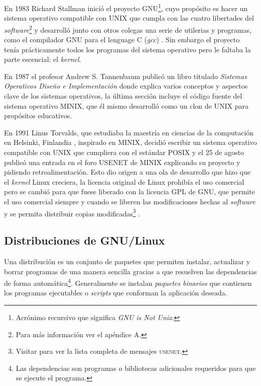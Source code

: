 En 1983 Richard Stallman inici\'{o} el proyecto \textsc{GNU}\footnote{Acr\'{o}nimo recursivo que significa \textit{GNU is Not Unix}.}, cuyo prop\'{o}sito es hacer un sistema operativo compatible con \textsc{UNIX} que cumpla con las cuatro libertades del \textit{software}\footnote{Para m\'{a}s informaci\'{o}n ver el ap\'{e}ndice A.} y desarroll\'{o} junto con otros colegas una serie de utilerias y programas, como el compilador \textsc{GNU} para el lenguage \textsc{C} (\textit{gcc}) \cite{_about_????}. Sin embargo el proyecto ten\'{i}a pr\'{a}cticamente todos los programas del sistema operativo pero le faltaba la parte escencial: el \textit{kernel}.

En 1987 el profesor Andrew S. Tannenbaum public\'{o} un libro titulado \textit{Sistemas Operativos Dise\~{n}o e Implementaci\'{o}n} \cite{tanenbaum_operating_2006} donde explica varios conceptos y aspectos clave de los sistemas operativos, la \'{u}ltima secci\'{o}n incluye el c\'{o}digo fuente del sistema operativo \textsc{MINIX}, que \'{e}l mismo desarroll\'{o} como un clon de \textsc{UNIX} para prop\'{o}sitos educativos\cite{_complete_????}.

En 1991 Linus Torvalds, que estudiaba la maestr\'{i}a en ciencias de la computaci\'{o}n en Helsinki, Finlandia \cite{_staff_????}, inspirado en \textsc{MINIX}, decidi\'{o} escribir un sistema operativo compatible con UNIX que cumpliera con el est\'{a}ndar \textsc{POSIX} y el 25 de agosto public\'{o} una entrada en el foro \textsc{USENET} de \textsc{MINIX} \cite{_history_????} explicando su proyecto y pidiendo retroalimentaci\'{o}n. Esto dio origen a una ola de desarrollo que hizo que el \textit{kernel} Linux creciera, la licencia original de Linux prohib\'{i}a el uso comercial pero se cambi\'{o} para que fuese liberado con la licencia \textsc{GPL} de \textsc{GNU}, que permite el uso comercial siempre y cuando se liberen las modificaciones hechas al \textit{software} y se permita distribuir copias modificadas\footnote{Visitar \cite{_linuxs_????} para ver la lista completa de mensajes \textsc{usenet}.} \cite{_linux_????-3}.

  \subsection {Distribuciones de GNU/Linux}

Una distribuci\'{o}n es un conjunto de paquetes que permiten instalar, actualizar y borrar programas de una manera sencilla gracias a que resuelven las dependencias de forma autom\'{a}tica\footnote{Las dependencias son programas o bibliotecas adicionales requeridos para que se ejecute el programa.}. Generalmente se instalan \textit{paquetes binarios} que contienen los programas ejecutables o \textit{scripts} que conforman la aplicaci\'{o}n deseada.

